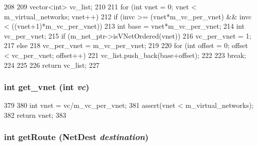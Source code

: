 \begin{DoxyCode}
208 {
209     vector<int> vc_list;
210 
211     for (int vnet = 0; vnet < m_virtual_networks; vnet++) {
212         if (invc >= (vnet*m_vc_per_vnet) && invc < ((vnet+1)*m_vc_per_vnet)) {
213             int base = vnet*m_vc_per_vnet;
214             int vc_per_vnet;
215             if (m_net_ptr->isVNetOrdered(vnet))
216                 vc_per_vnet = 1;
217             else
218                 vc_per_vnet = m_vc_per_vnet;
219 
220             for (int offset = 0; offset < vc_per_vnet; offset++) {
221                 vc_list.push_back(base+offset);
222             }
223             break;
224         }
225     }
226     return vc_list;
227 }
\end{DoxyCode}
\hypertarget{classRouter_ae73de77352867d272505f41222809e17}{
\subsubsection[{get\_\-vnet}]{\setlength{\rightskip}{0pt plus 5cm}int get\_\-vnet (int {\em vc})}}
\label{classRouter_ae73de77352867d272505f41222809e17}



\begin{DoxyCode}
379 {
380     int vnet = vc/m_vc_per_vnet;
381     assert(vnet < m_virtual_networks);
382     return vnet;
383 }
\end{DoxyCode}
\hypertarget{classRouter_a2e327aa228d7975550910a9dfc67e222}{
\subsubsection[{getRoute}]{\setlength{\rightskip}{0pt plus 5cm}int getRoute ({\bf NetDest} {\em destination})}}
\label{classRouter_a2e327aa228d7975550910a9dfc67e222}



